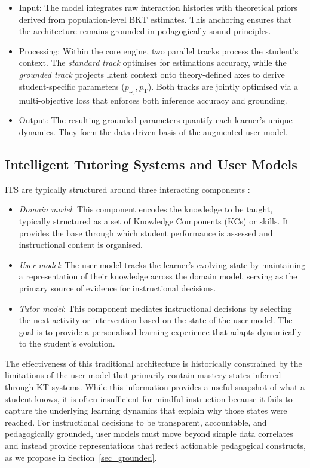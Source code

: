 \documentclass[runningheads]{llncs}
\begin{document}
\begin{itemize}
  \item Input: The model integrates raw interaction histories with theoretical priors derived from population-level BKT estimates. This anchoring ensures that the architecture remains grounded in pedagogically sound principles.
  \item Processing: Within the core engine, two parallel tracks process the student's context. The \textit{standard track} optimises for estimations accuracy, while the \textit{grounded track} projects latent context onto theory-defined axes to derive student-specific parameters ($p_{\text{L}_0}, p_{\text{T}}$). Both tracks are jointly optimised via a multi-objective loss that enforces both inference accuracy and grounding.
  \item Output: The resulting grounded parameters quantify each learner's unique dynamics. They form the data-driven basis of the augmented user model.
\end{itemize}



\subsection{Intelligent Tutoring Systems and User Models}
\label{sub_its}

ITS are typically structured around three interacting components \cite{nkambou2010advances}:

\begin{itemize}
    \item \textit{Domain model}: This component encodes the knowledge to be taught, typically structured as a set of Knowledge Components (KCs) or skills. It provides the base through which student performance is assessed and instructional content is organised.
    \item \textit{User model}: The user model tracks the learner's evolving state by maintaining a representation of their knowledge across the domain model, serving as the primary source of evidence for instructional decisions. 
    \item \textit{Tutor model}: This component mediates instructional decisions by selecting the next activity or intervention based on the state of the user model. The goal is to provide a personalised learning experience that adapts dynamically to the student's evolution.
\end{itemize}
The effectiveness of this traditional architecture is historically constrained by the limitations of the user model that primarily contain mastery states inferred through KT systems. While this information provides a useful snapshot of what a student knows, it is often insufficient for mindful instruction because it fails to capture the underlying learning dynamics that explain why those states were reached. For instructional decisions to be transparent, accountable, and pedagogically grounded, user models must move beyond simple data correlates and instead provide representations that reflect actionable pedagogical constructs, as we propose in Section~\ref{sec_grounded}.
\end{document}
